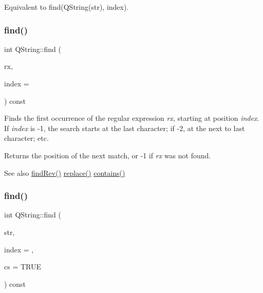 Equivalent to find(\+Q\+String(str), index). \mbox{\label{class_q_string_a8d0cb0b0f4448e196443561020e1438c}} 
\subsubsection{\texorpdfstring{find()}{find()}\hspace{0.1cm}{\footnotesize\ttfamily [3/5]}}
{\footnotesize\ttfamily int Q\+String\+::find (\begin{DoxyParamCaption}\item[{const \mbox{\hyperlink{class_q_reg_exp}{Q\+Reg\+Exp}} \&}]{rx,  }\item[{int}]{index = {} }\end{DoxyParamCaption}) const}

Finds the first occurrence of the regular expression {\itshape rx}, starting at position {\itshape index}. If {\itshape index} is -\/1, the search starts at the last character; if -\/2, at the next to last character; etc.

Returns the position of the next match, or -\/1 if {\itshape rx} was not found.

\begin{DoxySeeAlso}{See also}
\mbox{\hyperlink{class_q_string_a97b5c9712f3f145d52f91d816763ceea}{find\+Rev()}} \mbox{\hyperlink{class_q_string_aa785aa8e254ae8704f1a960245f3337e}{replace()}} \mbox{\hyperlink{class_q_string_addd0afccd10afee3a1b42ceaaf3206b8}{contains()}} 
\end{DoxySeeAlso}
\mbox{\label{class_q_string_a669b2ce308f70c955801fa7b44329aeb}} 
\subsubsection{\texorpdfstring{find()}{find()}\hspace{0.1cm}{\footnotesize\ttfamily [4/5]}}
{\footnotesize\ttfamily int Q\+String\+::find (\begin{DoxyParamCaption}\item[{const \mbox{\hyperlink{class_q_string}{Q\+String}} \&}]{str,  }\item[{int}]{index = {},  }\item[{bool}]{cs = {\ttfamily TRUE} }\end{DoxyParamCaption}) const}

